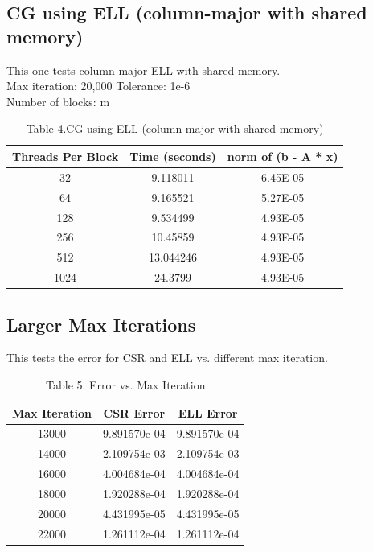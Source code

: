 \documentclass[a4paper,11pt,BCOR10mm,oneside,headsepline]{scrartcl}
\begin{document}
		\subsection{CG using ELL (column-major with shared memory)}
		This one tests column-major ELL with shared memory.\\
		Max iteration: 20,000 Tolerance: 1e-6\\
		Number of blocks: m\\
		
		\begin{table}[!htbp]
			\centering
			\begin{tabular}{|c|c|c|}
				\hline
				\textbf{Threads Per Block} & \textbf{Time (seconds)} & \textbf{norm of (b - A * x)} \\ \hline
				32                         & 9.118011                & 6.45E-05                     \\ \hline
				64                         & 9.165521                & 5.27E-05                     \\ \hline
				128                        & 9.534499                & 4.93E-05                     \\ \hline
				256                        & 10.45859                & 4.93E-05                     \\ \hline
				512                        & 13.044246               & 4.93E-05                     \\ \hline
				1024                       & 24.3799                 & 4.93E-05                     \\ \hline
			\end{tabular}
			\caption*{Table 4.CG using ELL (column-major with shared memory)}
		\end{table}
		
		\subsection{Larger Max Iterations}
		This tests the error for CSR and ELL vs. different max iteration.
		\begin{table}[!htbp]
			\centering
			\begin{tabular}{|c|c|c|}
				\hline
				\textbf{Max Iteration} & \textbf{CSR Error} & \textbf{ELL Error} \\ \hline
				13000                  & 9.891570e-04       & 9.891570e-04       \\ \hline
				14000                  & 2.109754e-03       & 2.109754e-03       \\ \hline
				16000                  & 4.004684e-04       & 4.004684e-04       \\ \hline
				18000                  & 1.920288e-04       & 1.920288e-04       \\ \hline
				20000                  & 4.431995e-05       & 4.431995e-05       \\ \hline
				22000                  & 1.261112e-04       & 1.261112e-04       \\ \hline
			\end{tabular}
			\caption*{Table 5. Error vs. Max Iteration}
		\end{table}
		
\end{document}
